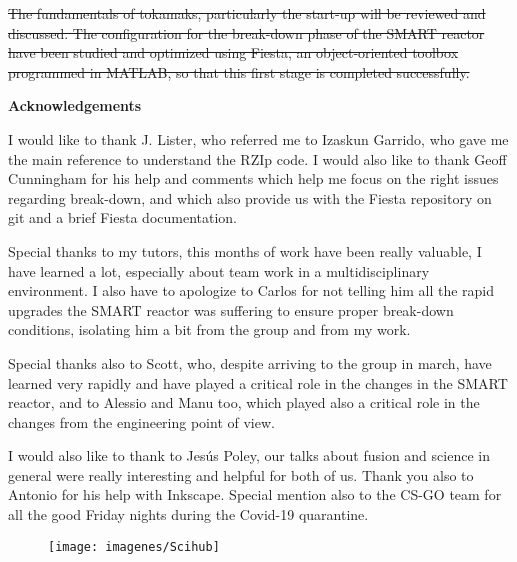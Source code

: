 \documentclass[a4paper,12pt,oneside]{book}
\begin{document}
\st{The fundamentals of tokamaks, particularly the start-up will be reviewed and discussed. The configuration for the break-down phase of the SMART reactor have been studied and optimized using Fiesta, an object-oriented toolbox programmed in MATLAB, so that this first stage is completed successfully.}


\newpage

\begin{center}
\begin{large}
\textbf{Acknowledgements}
\end{large}

\end{center}

I would like to thank J. Lister, who referred me to Izaskun Garrido, who gave me the main reference to understand the RZIp code.  I would also like to thank Geoff Cunningham for his help and comments which help me focus on the right issues regarding break-down, and which also provide us with the Fiesta repository on git and a brief Fiesta documentation.

Special thanks to my tutors, this months of work have been really valuable, I have learned a lot, especially about team work in a multidisciplinary environment. I also have to apologize to Carlos for not telling him all the rapid upgrades the SMART reactor was suffering to ensure proper break-down conditions, isolating him a bit from the group and from my work.

Special thanks also to Scott, who, despite arriving to the group in march,  have learned very rapidly and have played a critical role in the changes in the SMART reactor, and to Alessio and Manu too, which played also a critical role in the changes from the engineering point of view. 

I would also like to thank to Jesús Poley, our talks about fusion and science in general were really interesting and helpful for both of us. Thank you also to Antonio for his help with Inkscape. Special mention also to the CS-GO team for all the good Friday nights during the Covid-19 quarantine.




\begin{figure}[b]
\centering
\texttt{[image: imagenes/Scihub]}
\end{figure}
\end{document}
